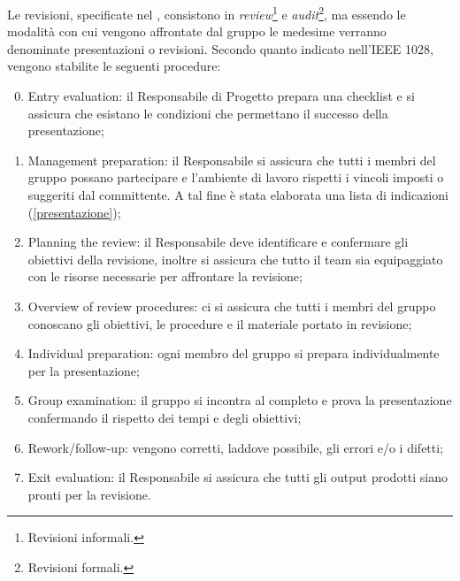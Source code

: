 Le revisioni, specificate nel \PianoDiProgetto, consistono in \textit{review}\footnote{Revisioni informali.} e \textit{audit}\footnote{Revisioni formali.}, ma essendo le modalit\`a con cui vengono affrontate dal gruppo le medesime verranno denominate presentazioni o revisioni. Secondo quanto indicato nell'IEEE 1028, vengono stabilite le seguenti procedure:
\begin{enumerate}
	\setcounter{enumi}{-1}
	\item Entry evaluation: il Responsabile di Progetto prepara una checklist e si assicura che esistano le condizioni che permettano il successo della presentazione;
	\item Management preparation: il Responsabile si assicura che tutti i membri del gruppo possano partecipare e l'ambiente di lavoro rispetti i vincoli imposti o suggeriti dal committente. A tal fine è stata elaborata una lista di indicazioni (\ref{presentazione});
	\item Planning the review: il Responsabile deve identificare e confermare gli obiettivi della revisione, inoltre si assicura che tutto il team sia equipaggiato con le risorse necessarie per affrontare la revisione;
	\item Overview of review procedures: ci si assicura che tutti i membri del gruppo conoscano gli obiettivi, le procedure e il materiale portato in revisione;
	\item Individual preparation: ogni membro del gruppo si prepara individualmente per la presentazione;
	\item Group examination: il gruppo si incontra al completo e prova la presentazione confermando il rispetto dei tempi e degli obiettivi;
	\item Rework/follow-up: vengono corretti, laddove possibile,  gli errori e/o i difetti;
	\item Exit evaluation: il Responsabile si assicura che tutti gli output prodotti siano pronti per la revisione.
\end{enumerate}

